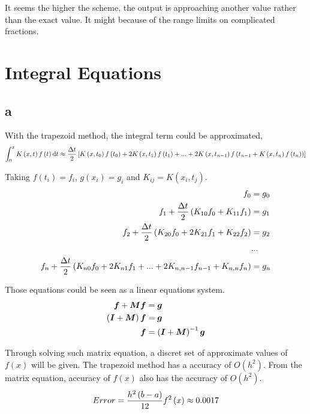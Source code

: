 \documentclass[letterpaper,10pt]{article}
\begin{document}
It seems the higher the scheme, the output is approaching another value rather than the exact value. 
It might because of the range limits on complicated fractions. 

\section{Integral Equations}
\subsection{a}
With the trapezoid method, the integral term could be approximated, 
\begin{equation}
  \int_0^x K\left(x,t\right)f\left(t\right)\mathrm{d}t \approx \frac{\Delta t}{2}
  \left[K\left(x,t_0\right)f\left(t_0\right)+2K\left(x,t_1\right)f\left(t_1\right)+...+2K\left(x,t_{n-1}\right)f\left(t_{n-1}+K\left(x,t_n\right)f\left(t_n\right)\right)\right]\notag
\end{equation}

Taking $f\left(t_i\right)=f_i$, $g\left(x_i\right) = g_i$ and $K_{ij} = K\left(x_i,t_j\right)$. 
\begin{align}
    f_0 &= g_0\notag\\
    f_1 + \frac{\Delta t}{2}\left(K_{10}f_0 + K_{11}f_1\right) &= g_1\notag\\
    f_2 + \frac{\Delta t}{2}\left(K_{20}f_0 + 2K_{21}f_1 + K_{22}f_2\right) &= g_2\notag\\
    &...\notag\\
    f_n + \frac{\Delta t}{2}\left(K_{n0}f_0 + 2K_{n1}f_1 + ...+ 2K_{n,n-1}f_{n-1}+K_{n,n}f_n\right) &= g_n\notag
\end{align}

Those equations could be seen as a linear equations system. 
\begin{align}
  \bm{f} + \bm{Mf} &= \bm{g}\notag\\
  \left(\bm{I}+\bm{M}\right)\bm{f} &= \bm{g}\notag\\
  \bm{f} &= \left(\bm{I}+\bm{M}\right)^{-1} \bm{g}\notag
\end{align}

Through solving such matrix equation, a discret set of approximate values of $f\left(x\right)$ will be given. 
The trapezoid method has a accuracy of $O\left(h^2\right)$. From the matrix equation, accuracy of $f\left(x\right)$ also has the accuracy of $O\left(h^2\right)$. 
\begin{equation}
  Error = \frac{h^2\left(b-a\right)}{12}f^{2}\left(x\right)\approx 0.0017\notag
\end{equation}
\end{document}

